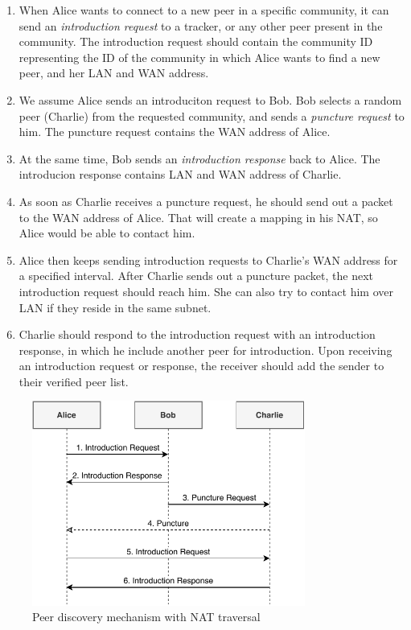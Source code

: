 \begin{enumerate}
    \item When Alice wants to connect to a new peer in a specific community, it can send an \textit{introduction request} to a tracker, or any other peer present in the community. The introduction request should contain the community ID representing the ID of the community in which Alice wants to find a new peer, and her LAN and WAN address.
    \item We assume Alice sends an introduciton request to Bob. Bob selects a random peer (Charlie) from the requested community, and sends a \textit{puncture request} to him. The puncture request contains the WAN address of Alice.
    \item At the same time, Bob sends an \textit{introduction response} back to Alice. The introducion response contains LAN and WAN address of Charlie.
    \item As soon as Charlie receives a puncture request, he should send out a packet to the WAN address of Alice. That will create a mapping in his NAT, so Alice would be able to contact him.
    \item Alice then keeps sending introduction requests to Charlie's WAN address for a specified interval. After Charlie sends out a puncture packet, the next introduction request should reach him. She can also try to contact him over LAN if they reside in the same subnet.
    \item Charlie should respond to the introduction request with an introduction response, in which he include another peer for introduction. Upon receiving an introduction request or response, the receiver should add the sender to their verified peer list.
\end{enumerate}

\begin{figure}[h!]
    \centering
    \includegraphics[width=0.8\textwidth]{diagrams/nat-puncturing}
    \caption{Peer discovery mechanism with NAT traversal}
    \label{nat-puncturing}
\end{figure}


